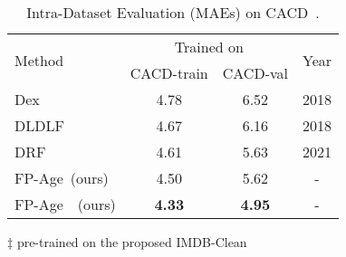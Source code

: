 \begin{table}[tb]
	\caption{Intra-Dataset Evaluation (MAEs) on CACD~\cite{chenFaceRecognitionRetrieval2015}.}\label{tab:cacd-results}
	\begin{center}
	\begin{threeparttable}
		\begin{tabular}{l|c|c|c}
    		\toprule
			\multirow{2}{*}{Method} & \multicolumn{2}{c|}{Trained on} &\multirow{2}{*}{Year} \\
			& CACD-train & CACD-val & \\
			\midrule \midrule
			Dex\cite{rotheDeepExpectationReal2018} & 4.78 & 6.52 & 2018 \\
			DLDLF~\cite{shenDeepRegressionForests2018} & 4.67 & 6.16 & 2018 \\
			DRF~\cite{shenDeepDifferentiableRandom2021} &4.61 & 5.63 & 2021 \\
			\hline
			FP-Age~(ours) & 4.50 & 5.62 & -\\
			FP-Age\tnote{$\ddagger$}~~(ours) & \textbf{4.33} &  \textbf{4.95} & - \\ \bottomrule
		\end{tabular}
    \begin{tablenotes}
    \item $\ddagger$ pre-trained on the proposed IMDB-Clean 
    \end{tablenotes}
	\end{threeparttable}
	\end{center}
\end{table}

    	
	




